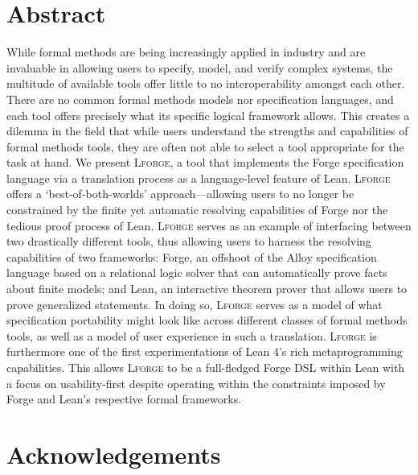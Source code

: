 \newpage
\section*{Abstract}
While formal methods are being increasingly applied in industry and are invaluable in allowing users to specify, model, and verify complex systems, the multitude of available tools offer little to no interoperability amongst each other. 
There are no common formal methods models nor specification languages, and each tool offers precisely what its specific logical framework allows. 
This creates a dilemma in the field that while users understand the strengths and capabilities of formal methods tools, they are often not able to select a tool appropriate for the task at hand. 
We present \textsc{Lforge}, a tool that implements the Forge specification language via a translation process as a language-level feature of Lean. 
\textsc{Lforge} offers a `best-of-both-worlds' approach---allowing users to no longer be constrained by the finite yet automatic resolving capabilities of Forge nor the tedious proof process of Lean.
\textsc{Lforge} serves as an example of interfacing between two drastically different tools, thus allowing users to harness the resolving capabilities of two frameworks: Forge, an offshoot of the Alloy specification language based on a relational logic solver that can automatically prove facts about finite models; and Lean, an interactive theorem prover that allows users to prove generalized statements. 
In doing so, \textsc{Lforge} serves as a model of what specification portability might look like across different classes of formal methods tools, as well as a model of user experience in such a translation. 
\textsc{Lforge} is furthermore one of the first experimentations of Lean 4's rich metaprogramming capabilities. This allows \textsc{Lforge} to be a full-fledged Forge DSL within Lean with a focus on usability-first despite operating within the constraints imposed by Forge and Lean's respective formal frameworks. 


\newpage
\section*{Acknowledgements}

\vfill

